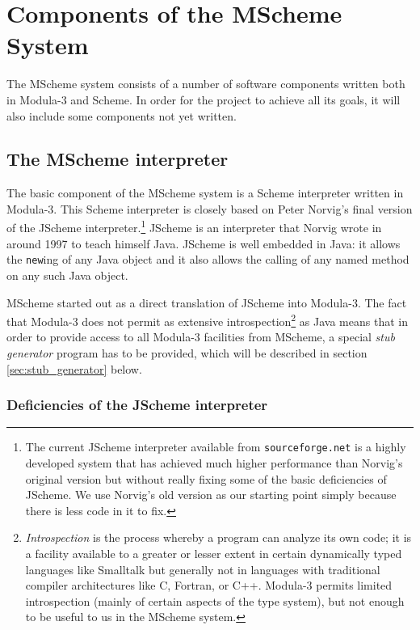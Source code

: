 \section{Components of the MScheme System}

The MScheme system consists of a number of software components written
both in Modula-3 and Scheme.  In order for the project to achieve all its
goals, it will also include some components not yet written.

\subsection{The MScheme interpreter}

The basic component of the MScheme system is a Scheme interpreter
written in Modula-3.  This Scheme interpreter is closely based on
Peter Norvig's final version of the JScheme
interpreter\cite{jscheme}.\footnote{The current JScheme interpreter
  available from {\tt sourceforge.net} is a highly developed system
  that has achieved much higher performance than Norvig's original
  version but without really fixing some of the basic deficiencies of
  JScheme.  We use Norvig's old version as our starting point simply
  because there is less code in it to fix.}  JScheme is an interpreter
that Norvig wrote in around 1997 to teach himself Java.  JScheme is
well embedded in Java: it allows the {\tt new}ing of any Java object
and it also allows the calling of any named method on any such Java
object.

MScheme started out as a direct translation of JScheme into Modula-3.
The fact that Modula-3 does not permit as extensive
introspection\footnote{{\em Introspection\/} is the process whereby a
  program can analyze its own code; it is a facility available to a
  greater or lesser extent in certain dynamically typed languages like
  Smalltalk\cite{blue_book} but generally not in languages with
  traditional compiler architectures like C, Fortran, or C++.
  Modula-3 permits limited introspection (mainly of certain aspects of
  the type system), but not enough to be useful to us in the MScheme
  system.} as Java means that in order to provide access to all
Modula-3 facilities from MScheme, a special {\em stub generator\/}
program has to be provided, which will be described in section
\ref{sec:stub_generator} below.

\subsubsection{Deficiencies of the JScheme interpreter}

